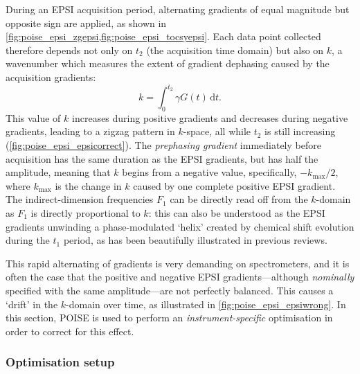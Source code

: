During an EPSI acquisition period, alternating gradients of equal magnitude but opposite sign are applied, as shown in \cref{fig:poise_epsi_zgepsi,fig:poise_epsi_tocsyepsi}. Each data point collected therefore depends not only on $t_2$ (the acquisition time domain) but also on $k$, a wavenumber which measures the extent of gradient dephasing caused by the acquisition gradients:
\begin{equation}
    \label{eq:epsi_k_space}
    k = \int_0^{t_2} \gamma G(t) \,\mathrm{d}t.
\end{equation}
This value of $k$ increases during positive gradients and decreases during negative gradients, leading to a zigzag pattern in $k$-space, all while $t_2$ is still increasing (\cref{fig:poise_epsi_epsicorrect}).
The \textit{prephasing gradient} immediately before acquisition has the same duration as the EPSI gradients, but has half the amplitude, meaning that $k$ begins from a negative value, specifically, $-k_\text{max} / 2$, where $k_\text{max}$ is the change in $k$ caused by one complete positive EPSI gradient.
The indirect-dimension frequencies $F_1$ can be directly read off from the $k$-domain as $F_1$ is directly proportional to $k$: this can also be understood as the EPSI gradients unwinding a phase-modulated `helix' created by chemical shift evolution during the $t_1$ period, as has been beautifully illustrated in previous reviews.\autocite{Frydman2003JACS,Tal2010PNMRS}

This rapid alternating of gradients is very demanding on spectrometers, and it is often the case that the positive and negative EPSI gradients---although \textit{nominally} specified with the same amplitude---are not perfectly balanced.
This causes a `drift' in the $k$-domain over time, as illustrated in \cref{fig:poise_epsi_epsiwrong}.
In this section, POISE is used to perform an \textit{instrument-specific} optimisation in order to correct for this effect.


\subsubsection{Optimisation setup}

